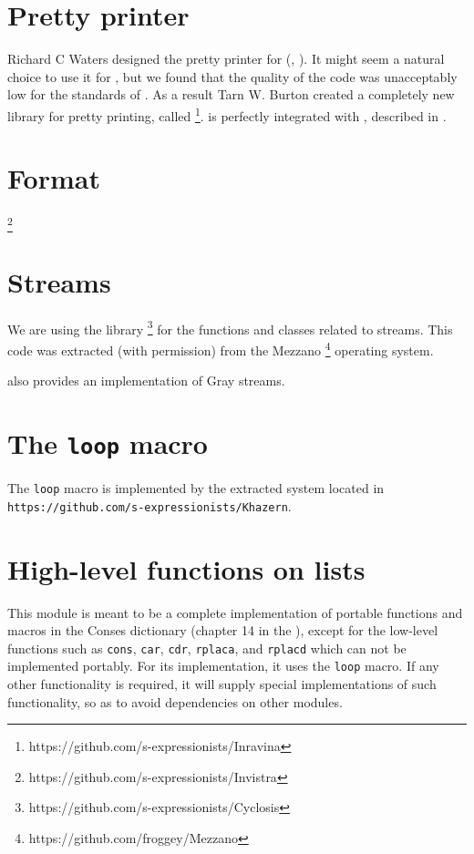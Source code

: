 \section{Pretty printer}
\label{sec-pretty-printer}

Richard C Waters designed the pretty printer for
\commonlisp{} (\cite{Waters89xp:a}, \cite{Waters:1992:UNC:1039991.1039996}).
It might seem a natural choice to use it for \sysname{}, but we found
that the quality of the code was unacceptably low for the standards of
\sysname{}.  As a result Tarn W. Burton created a completely new
library for pretty printing, called \inravina{}%
\footnote{https://github.com/s-expressionists/Inravina}.  \inravina{}
is perfectly integrated with \incless{}, described in
.

\section{Format}
\label{sec-format}

\footnote{https://github.com/s-expressionists/Invistra}

\section{Streams}
\label{sec-streams}

We are using the \cyclosis{} library%
\footnote{https://github.com/s-expressionists/Cyclosis} for the
\commonlisp{} functions and classes related to streams.  This code was
extracted (with permission) from the Mezzano%
\footnote{https://github.com/froggey/Mezzano}
operating system.

\cyclosis{} also provides an implementation of Gray streams.

\section{The \texttt{loop} macro} 
\label{sec-loop}

The \texttt{loop} macro is implemented by the extracted system
\khazern{} located in
\texttt{https://github.com/s-expressionists/Khazern}.

\section{High-level functions on lists}
\label{sec-constrictor}

This module is meant to be a complete implementation of portable
functions and macros in the Conses dictionary (chapter 14 in the
\hs{}), except for the low-level functions such as \texttt{cons},
\texttt{car}, \texttt{cdr}, \texttt{rplaca}, and \texttt{rplacd} which
can not be implemented portably.  For its implementation, it uses the
\texttt{loop} macro.  If any other functionality is required, it will
supply special implementations of such functionality, so as to avoid
dependencies on other modules.

